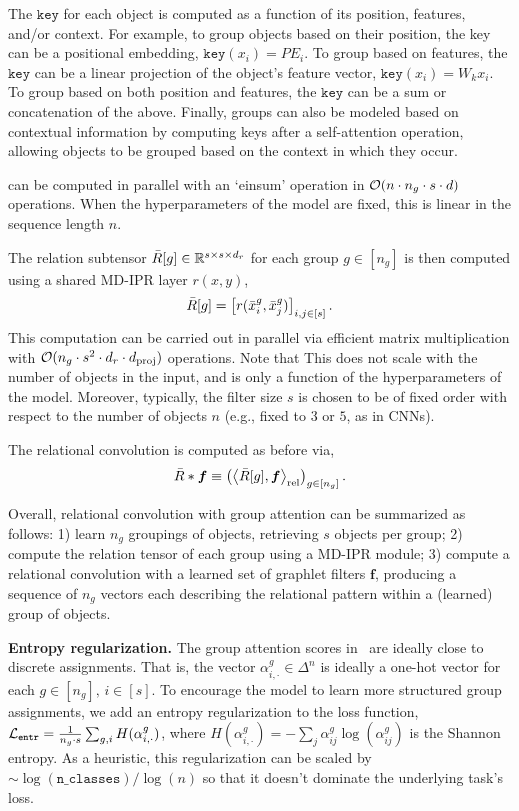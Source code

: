 The $\mathtt{key}$ for each object is computed as a function of its position, features, and/or context. For example, to group objects based on their position, the key can be a positional embedding, $\mathtt{key}(x_i) = PE_i$. To group based on features, the $\mathtt{key}$ can be a linear projection of the object's feature vector, $\mathtt{key}(x_i) = W_k x_i$. To group based on both position and features, the $\mathtt{key}$ can be a sum or concatenation of the above. Finally, groups can also be modeled based on contextual information by computing keys after a self-attention operation, allowing objects to be grouped based on the context in which they occur.

 can be computed in parallel with an `einsum' operation in ${\mathcal{O}}(n \cdot n_g \cdot s \cdot d)$ operations. When the hyperparameters of the model are fixed, this is linear in the sequence length $n$.

The relation subtensor $\bar{R}[g] \in \mathbb{R}^{s \times s \times d_r}$ for each group $g \in [n_g]$ is then computed using a shared MD-IPR layer $r(x, y)$,
\begin{equation}
    \bar{R}[g] = \left[r(\bar{x}_{i}^{g}, \bar{x}_{j}^{g})\right]_{i,j \in [s]}.
\end{equation}
This computation can be carried out in parallel via efficient matrix multiplication with ${\mathcal{O}}(n_g \cdot s^2 \cdot d_r \cdot d_{\mathrm{proj}})$ operations. Note that This does not scale with the number of objects in the input, and is only a function of the hyperparameters of the model. Moreover, typically, the filter size $s$ is chosen to be of fixed order with respect to the number of objects $n$ (e.g., fixed to $3$ or $5$, as in CNNs).

The relational convolution is computed as before via,
\begin{equation}
    \bar{R} \ast \bm{f} \equiv \left(\left\langle \bar{R}[g], \bm{f} \right\rangle_\mathrm{rel}\right)_{g \in [n_g]}.
\end{equation}

Overall, relational convolution with group attention can be summarized as follows: 1) learn $n_g$ groupings of objects, retrieving $s$ objects per group; 2) compute the relation tensor of each group using a MD-IPR module; 3) compute a relational convolution with a learned set of graphlet filters $\bm{f}$, producing a sequence of $n_g$ vectors each describing the relational pattern within a (learned) group of objects.

\textbf{Entropy regularization.} The group attention scores in~ are ideally close to discrete assignments. That is, the vector $\alpha_{i,\cdot}^{g} \in \Delta^{n}$ is ideally a one-hot vector for each $g \in [n_g],\, i \in [s]$. To encourage the model to learn more structured group assignments, we add an entropy regularization to the loss function, ${\mathcal{L}}_{\mathtt{entr}} = \frac{1}{n_g \cdot s} \sum_{g, i} H(\alpha_{i,\cdot}^{g})$, where $H(\alpha_{i,\cdot}^{g}) = - \sum_{j} \alpha_{ij}^{g} \log(\alpha_{ij}^g)$ is the Shannon entropy. As a heuristic, this regularization can be scaled by $\sim \log(\mathtt{n\_classes}) / \log(n)$ so that it doesn't dominate the underlying task's loss.

